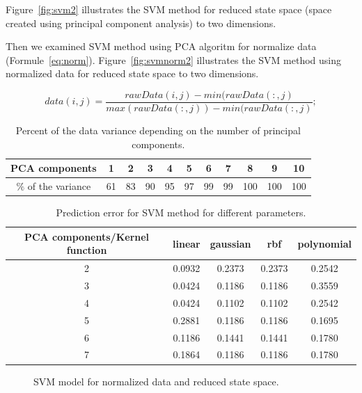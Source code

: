 \documentclass[
10pt, %
a4paper, %
oneside, %
headinclude,footinclude, %
BCOR5mm, %
]{scrartcl}
\begin{document}
Figure~\vref{fig:svm2} illustrates the SVM method for reduced state space (space created using principal component analysis) to two dimensions.

Then we examined SVM method using PCA algoritm for normalize data (Formule~\vref{eq:norm}). Figure~\vref{fig:svmnorm2} illustrates the SVM method using normalized data for reduced state space to two dimensions.

\begin{equation} 
 data(i,j) = \frac{rawData(i,j) - min(rawData(:,j)}{max(rawData(:,j)) - min(rawData(:,j)};
\label{eq:norm}
\end{equation}

\begin{table}[H]
	\centering
	\begin{tabular}{ c | c | c | c | c | c | c | c | c | c | c}
    PCA components  & 1 & 2 & 3 & 4 & 5 & 6 & 7 & 8 & 9 & 10 \\ \hline
    $ \% $ of the variance & 61 & 83 & 90 & 95 & 97 & 99 & 99 & 100 & 100 & 100 \\
  	\end{tabular}
  	\caption{Percent of the data variance depending on the number of principal components.}
  	\label{tab2}
\end{table}

\begin{table}[H]
	\centering
	\begin{tabular}{ c | c | c | c | c }
    PCA components/Kernel function & linear & gaussian & rbf & polynomial \\ \hline
    2 & 0.0932 & 0.2373 & 0.2373 & 0.2542 \\ \hline
    3 & \cellcolor{amber!25}0.0424 & 0.1186 & 0.1186 & 0.3559 \\ \hline
    4 & \cellcolor{amber!25}0.0424 & 0.1102 & 0.1102 & 0.2542 \\ \hline
    5 & 0.2881 & 0.1186 & 0.1186 & 0.1695 \\ \hline
    6 & 0.1186 & 0.1441 & 0.1441 & 0.1780 \\ \hline
    7 & 0.1864 & 0.1186 & 0.1186 & 0.1780 \\
  	\end{tabular}
  	\caption{Prediction error for SVM method for different parameters.}
  	\label{tab2}
\end{table}

\begin{figure}[H]
\centering 
{}%
\caption[An example of a floating figure]{SVM model for normalized data and reduced state space.} %
\label{fig:svmnorm2} 
\end{figure}
\end{document}
